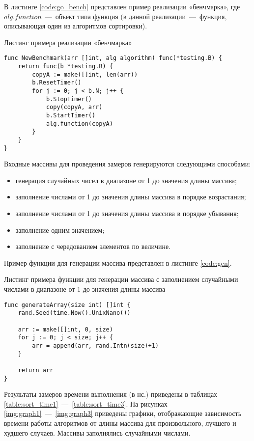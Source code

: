 В листинге \ref{code:go_bench} представлен пример реализации «бенчмарка», где $alg.function$~---~объект типа функция (в данной реализации~---~функция, описывающая один из алгоритмов сортировки).
\begin{code}
\caption{Листинг примера реализации «бенчмарка»}
\label{code:go_bench}
\begin{verbatim}
func NewBenchmark(arr []int, alg algorithm) func(*testing.B) {
	return func(b *testing.B) {
		copyA := make([]int, len(arr))
		b.ResetTimer()
		for j := 0; j < b.N; j++ {
			b.StopTimer()
			copy(copyA, arr)
			b.StartTimer()
			alg.function(copyA)
		}
	}
}
\end{verbatim}
\end{code}

Входные массивы для проведения замеров генерируются следующими способами:
\begin{itemize}
	\item генерация случайных чисел в диапазоне от 1 до значения длины массива;
	\item заполнение числами от 1 до значения длины массива в порядке возрастания;
	\item заполнение числами от 1 до значения длины массива в порядке убывания;
	\item заполнение одним значением;
	\item заполнение с чередованием элементов по величине.
\end{itemize}

Пример функции для генерации массива представлен в листинге \ref{code:gen}.

\newpage

\begin{code}
\caption{Листинг примера функции для генерации массива с заполнением случайными числами в диапазоне от 1 до значения длины массива}
\label{code:gen}
\begin{verbatim}
func generateArray(size int) []int {
	rand.Seed(time.Now().UnixNano())
	
	arr := make([]int, 0, size)
	for j := 0; j < size; j++ {
		arr = append(arr, rand.Intn(size)+1)
	}

	return arr
}
\end{verbatim}
\end{code}

\newpage

Результаты замеров времени выполнения (в нс.) приведены в таблицах \ref{table:sort_time1}~---~\ref{table:sort_time3}. На рисунках \ref{img:graph1}~---~\ref{img:graph3} приведены графики, отображающие зависимость времени работы алгоритмов от длины массива для произвольного, лучшего и худшего случаев. Массивы заполнялись случайными числами.

